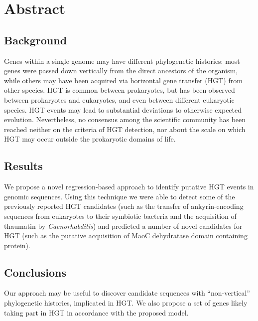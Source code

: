 \section{Abstract}
\label{abstract}

\subsection{Background}
\label{bg}
Genes within a single genome may have different phylogenetic histories: most
genes were passed down vertically from the direct ancestors of the
organism, while others may have been acquired via horizontal gene transfer
(HGT) from other species. HGT is common between prokaryotes, but has been
observed between prokaryotes and eukaryotes, and even between different
eukaryotic species. HGT events may lead to substantial deviations to otherwise
expected evolution.
Nevertheless, no consensus among the scientific community has been reached
neither on the criteria of HGT detection, nor about the scale on which HGT may
occur outside the prokaryotic domains of life.

\subsection{Results}
\label{res}
We propose a novel regression-based approach to identify putative HGT
events in genomic sequences. Using this technique we were able to detect some
of the previously reported HGT candidates (such as the transfer of
ankyrin-encoding sequences from eukaryotes to their symbiotic bacteria
and the acquisition of thaumatin by \textit{Caenorhabditis}) and predicted a
number of novel candidates for HGT (such as the putative acquisition of MaoC
dehydratase domain containing protein).

\subsection{Conclusions}
\label{concl}
Our approach may be useful to discover candidate sequences with
``non-vertical'' phylogenetic histories, implicated in HGT. We also propose a
set of genes likely taking part in HGT in accordance with the proposed model.
